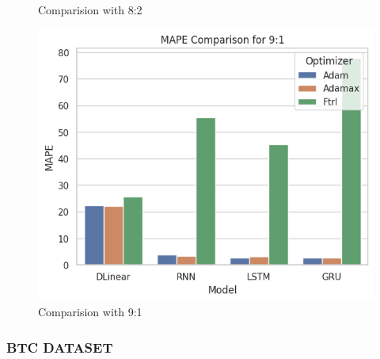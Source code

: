 \documentclass{ieeeojies}
\begin{document}
\begin{figure}[H]
\begin{minipage}{0.15\textwidth}
        \caption{Comparision with 8:2}
        \label{fig:2}
    \end{minipage}%
    \hfill
    \begin{minipage}{0.15\textwidth}
        \centering
        \includegraphics[width=1\textwidth]{image/MAPE_91_bnb.png}
        \caption{Comparision with 9:1}
        \label{fig:3}
    \end{minipage}
\end{figure}

\subsubsection{BTC DATASET}
\end{document}
